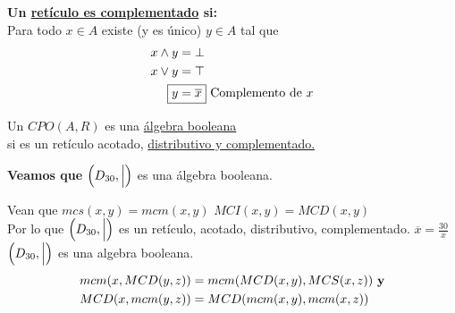 \documentclass[../main.tex]{subfiles}
\begin{document}
\textbf{Un \underline{retículo es complementado} si:}\\
Para todo $x\in A$ existe (y es único) $y\in A$ tal que
\begin{align*}
	x\wedge y &= \bot\\
	x\vee y &= \top\\
	\Aboxed{y &= \overline{x}} \text{ Complemento de $x$}
\end{align*}

Un $CPO(A,R)$ es una \underline{álgebra booleana}\\
si es un retículo acotado, \underline{distributivo y complementado.}

\textbf{Veamos que } $\Big{(}D_{30},\Big{|}\Big{)}$ es una álgebra booleana.
\begin{figure}[H]
	\centering
	
\end{figure}

Vean que $mcs(x,y)=mcm(x,y)$ $MCI(x,y)=MCD(x,y)$\\
Por lo que $\Big{(}D_{30},\Big{|}\Big{)}$
es un retículo, acotado, distributivo, complementado.
$\overline{x} = \frac{30}{x}$ $\Big{(}D_{30},\Big{|}\Big{)}$ es una
algebra booleana.
\begin{align*}
	mcm(x,MCD(y,z)) &= mcm(MCD(x,y),MCS(x,z)) \text{ \textbf{y}}\\
	MCD(x,mcm(y,z)) &= MCD(mcm(x,y),mcm(x,z))
\end{align*}
\end{document}
